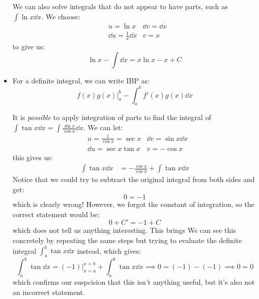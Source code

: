 \begin{itemize}
\begin{example}
        We can also solve integrals that do not appear to have parts, such as $\int \ln x \dd{x}$. We choose:
        \begin{align}
            &u=\ln x            &\dd{v} =\dd{x} \\ 
            &\dd{u}=\frac{1}{x}\dd{x} &v=x
        \end{align}
        to give us:
        \begin{equation}
            \ln x - \int \dd{x} = x\ln x - x + C
        \end{equation}
    \end{example}
    \item For a definite integral, we can write IBP as:
    \begin{equation}
        f(x)g(x)\Big|^b_a-\int_a^b f'(x)g(x) \dd{x}
    \end{equation}
    \begin{example}
        It is \textit{possible} to apply integration of parts to find the integral of $\int \tan x \dd{x} = \int \frac{\sin x}{\cos x} \dd{x}$. We can let:
        \begin{align}
            &u=\frac{1}{\cos x}=\sec x            &\dd{v} =\sin x\dd{x} \\ 
            &\dd{u}=\sec x\tan x &v=-\cos x
        \end{align}
        this gives us:
        \begin{align}
            \int \tan x \dd{x} &= -\frac{\cos x}{\cos x}+ \int \tan x \dd{x}
        \end{align}
        Notice that we could try to subtract the original integral from both sides and get:
        \begin{equation}
            0 = -1
        \end{equation}
        which is clearly wrong! However, we forgot the constant of integration, so the correct statement would be:
        \begin{equation}
            0 + C' = -1 + C
        \end{equation}
        which does not tell us anything interesting. This brings We can see this concretely by repeating the same steps but trying to evaluate the definite integral $\int_a^b \tan x \dd{x}$ instead, which gives:
        \begin{equation}
            \int_a^b \tan \dd{x} = \left(-1\right)\Big|^{x=b}_{x=a} + \int_a^b \tan x \dd{x} \implies 0 = (-1) - (-1) \implies 0=0
        \end{equation}
        which confirms our suspcision that this isn't anything useful, but it's also not an incorrect statement.

\end{example}
\end{itemize}
